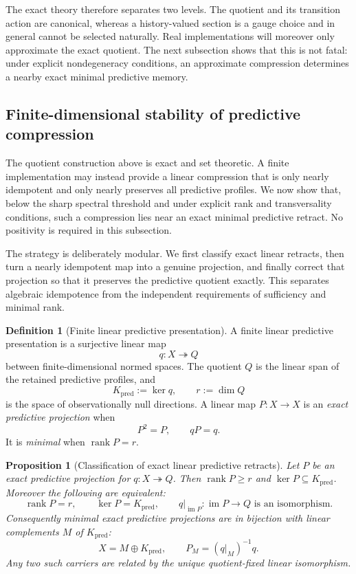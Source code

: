 \documentclass[11pt]{article}
\newtheorem{proposition}[theorem]{Proposition}
\theoremstyle{definition}
\newtheorem{definition}[theorem]{Definition}
\theoremstyle{remark}
\newcommand{\rank}{\operatorname{rank}}
\newcommand{\pred}{\mathrm{pred}}
\begin{document}
The exact theory therefore separates two levels.  The quotient and its transition
action are canonical, whereas a history-valued section is a gauge choice and in
general cannot be selected naturally.  Real implementations will moreover only
approximate the exact quotient.  The next subsection shows that this is not fatal:
under explicit nondegeneracy conditions, an approximate compression determines a
nearby exact minimal predictive memory.

\subsection{Finite-dimensional stability of predictive compression}
\label{subsec:predictive-compression-stability}

The quotient construction above is exact and set theoretic.  A finite
implementation may instead provide a linear compression that is only nearly
idempotent and only nearly preserves all predictive profiles.  We now show
that, below the sharp spectral threshold and under explicit rank and
transversality conditions, such a compression lies near an exact minimal
predictive retract.  No positivity is required in this subsection.

The strategy is deliberately modular.  We first classify exact linear retracts,
then turn a nearly idempotent map into a genuine projection, and finally correct
that projection so that it preserves the predictive quotient exactly.  This
separates algebraic idempotence from the independent requirements of sufficiency
and minimal rank.

\begin{definition}[Finite linear predictive presentation]
\label{def:linear-predictive-presentation}
A finite linear predictive presentation is a surjective linear map
\[
 q:X\twoheadrightarrow Q
\]
between finite-dimensional normed spaces.  The quotient \(Q\) is the linear
span of the retained predictive profiles, and
\[
 K_{\pred}:=\ker q,\qquad r:=\dim Q
\]
is the space of observationally null directions.  A linear map \(P:X\to X\)
is an \emph{exact predictive projection} when
\[
 P^2=P,\qquad qP=q.
\]
It is \emph{minimal} when \(\rank P=r\).
\end{definition}

\begin{proposition}[Classification of exact linear predictive retracts]
\label{prop:linear-predictive-retracts}
Let \(P\) be an exact predictive projection for
\(q:X\twoheadrightarrow Q\).  Then \(\rank P\ge r\) and
\(\ker P\subseteq K_{\pred}\).  Moreover the following are equivalent:
\[
 \rank P=r,\qquad
 \ker P=K_{\pred},\qquad
 q|_{\operatorname{im}P}:\operatorname{im}P\longrightarrow Q
 \text{ is an isomorphism}.
\]
Consequently minimal exact predictive projections are in bijection with
linear complements \(M\) of \(K_{\pred}\):
\[
 X=M\oplus K_{\pred},\qquad
 P_M=(q|_M)^{-1}q.
\]
Any two such carriers are related by the unique quotient-fixed linear
isomorphism.
\end{proposition}
\end{document}
